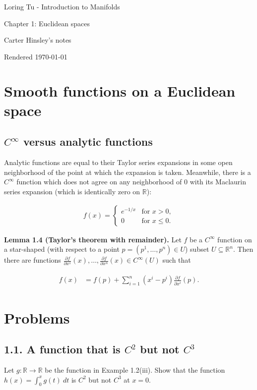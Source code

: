 \documentclass[a4paper]{article}
\newcommand{\R}{\mathbb{R}}
\begin{document}
\begin{center}
\LARGE{Loring Tu - Introduction to Manifolds}

\Large{Chapter 1: Euclidean spaces}

\large{Carter Hinsley's notes}

Rendered \today
\end{center}

\section{Smooth functions on a Euclidean space}

\subsection{$C^\infty$ versus analytic functions}

Analytic functions are equal to their Taylor series expansions in some open neighborhood of the point at which the expansion is taken. Meanwhile, there is a $C^\infty$ function which does not agree on any neighborhood of $0$ with its Maclaurin series expansion (which is identically zero on $\R$):

\begin{align}
    f(x) = \left\{\begin{matrix} e^{-1/x} & \text{for } x > 0, \\ 0 & \text{for } x \leq 0. \end{matrix}\right.
\end{align}

\textbf{Lemma 1.4 (Taylor's theorem with remainder).} Let $f$ be a $C^\infty$ function on a star-shaped (with respect to a point $p = (p^1, \ldots, p^n) \in U$) subset $U \subseteq \R^n$. Then there are functions $\frac{\partial f}{\partial x^1}(x), \ldots, \frac{\partial f}{\partial x^n}(x) \in C^\infty(U)$ such that

\begin{align}
\begin{split}
    f(x) &= f(p) + \sum_{i=1}^n (x^i - p^i)\frac{\partial f}{\partial x^i}(p).
\end{split}
\end{align}

\section*{Problems}

\subsection*{1.1. A function that is $C^2$ but not $C^3$}

Let $g : \R \to \R$ be the function in Example 1.2(iii). Show that the function $h(x) = \int_0^x g(t)\ dt$ is $C^2$ but not $C^3$ at $x = 0$.
\end{document}
